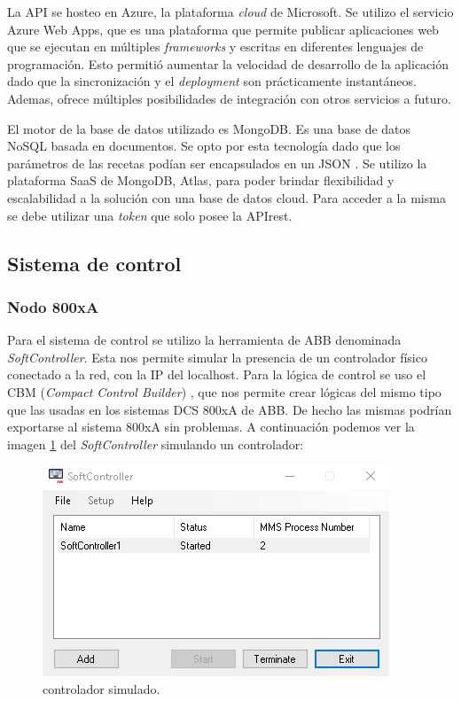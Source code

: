 La API se hosteo en Azure, la plataforma \textit{cloud} de Microsoft. Se utilizo el servicio Azure Web Apps, que es una plataforma que permite publicar aplicaciones web que se ejecutan en múltiples \textit{frameworks} y escritas en diferentes lenguajes de programación. Esto permitió aumentar la velocidad de desarrollo de la aplicación dado que la sincronización y el \textit{deployment} son prácticamente instantáneos. Ademas, ofrece múltiples posibilidades de integración con otros servicios a futuro.

El motor de la base de datos utilizado es MongoDB. Es una base de datos NoSQL basada en documentos. Se opto por esta tecnología dado que los parámetros de las recetas podían ser encapsulados en un JSON . Se utilizo la plataforma SaaS de MongoDB, Atlas, para poder brindar flexibilidad y escalabilidad a la solución con una base de datos cloud. Para acceder a la misma se debe utilizar una \textit{token} que solo posee la APIrest. 

\subsection{Sistema de control}
\subsubsection{Nodo 800xA}
Para el sistema de control se utilizo la herramienta de ABB denominada \textit{SoftController}. Esta nos permite simular la presencia de un controlador físico conectado a la red, con la IP del localhost. Para la lógica de control se uso el CBM (\textit{Compact Control Builder}) , que nos permite crear lógicas del mismo tipo que las usadas en los sistemas DCS 800xA de ABB. De hecho las mismas podrían exportarse al sistema 800xA sin problemas. A continuación podemos ver la imagen \ref{fig:c1} del \textit{SoftController} simulando un controlador:

\begin{figure}[htpb]
	\centering
	\includegraphics[scale=.6]{./Figures/c1.png}
	\caption{controlador simulado\protect\footnotemark.}
	\label{fig:c1}
\end{figure}

